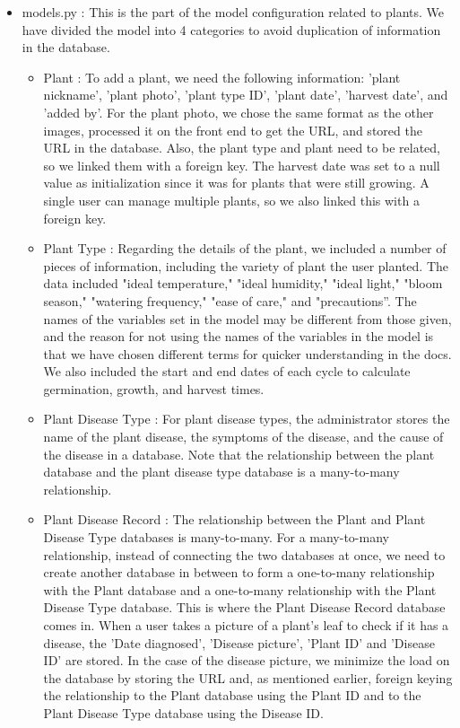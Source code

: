 \documentclass[conference, a4paper]{IEEEtran}
\begin{document}
\begin{enumerate}
\begin{itemize}
\begin{itemize}
        \item models.py : This is the part of the model configuration related to plants. We have divided the model into 4 categories to avoid duplication of information in the database.
        \begin{itemize}
            \item Plant : To add a plant, we need the following information: 'plant nickname', 'plant photo', 'plant type ID', 'plant date', 'harvest date', and 'added by'. For the plant photo, we chose the same format as the other images, processed it on the front end to get the URL, and stored the URL in the database. Also, the plant type and plant need to be related, so we linked them with a foreign key. The harvest date was set to a null value as initialization since it was for plants that were still growing. A single user can manage multiple plants, so we also linked this with a foreign key. \\
            \item Plant Type : Regarding the details of the plant, we included a number of pieces of information, including the variety of plant the user planted. The data included "ideal temperature," "ideal humidity," "ideal light," "bloom season," "watering frequency," "ease of care," and "precautions”. The names of the variables set in the model may be different from those given, and the reason for not using the names of the variables in the model is that we have chosen different terms for quicker understanding in the docs. We also included the start and end dates of each cycle to calculate germination, growth, and harvest times. \\
            \item Plant Disease Type : For plant disease types, the administrator stores the name of the plant disease, the symptoms of the disease, and the cause of the disease in a database. Note that the relationship between the plant database and the plant disease type database is a many-to-many relationship. \\
            \item Plant Disease Record : The relationship between the Plant and Plant Disease Type databases is many-to-many. For a many-to-many relationship, instead of connecting the two databases at once, we need to create another database in between to form a one-to-many relationship with the Plant database and a one-to-many relationship with the Plant Disease Type database. This is where the Plant Disease Record database comes in. When a user takes a picture of a plant's leaf to check if it has a disease, the 'Date diagnosed', 'Disease picture', 'Plant ID' and 'Disease ID' are stored. In the case of the disease picture, we minimize the load on the database by storing the URL and, as mentioned earlier, foreign keying the relationship to the Plant database using the Plant ID and to the Plant Disease Type database using the Disease ID.
        \end{itemize}


\end{itemize}
\end{itemize}
\end{enumerate}
\end{document}
